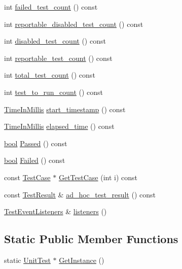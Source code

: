 \begin{DoxyCompactItemize}
int \hyperlink{classtesting_1_1UnitTest_ace1c860482b4ae5c341df5a9665e5c08}{failed\+\_\+test\+\_\+count} () const
\item 
int \hyperlink{classtesting_1_1UnitTest_a2a2835db178d5c8569507db9f0a3d54f}{reportable\+\_\+disabled\+\_\+test\+\_\+count} () const
\item 
int \hyperlink{classtesting_1_1UnitTest_ad69ccf3d4a9bc7333badeafbde3bc76b}{disabled\+\_\+test\+\_\+count} () const
\item 
int \hyperlink{classtesting_1_1UnitTest_a449d0e0350ef146040cd37679c005248}{reportable\+\_\+test\+\_\+count} () const
\item 
int \hyperlink{classtesting_1_1UnitTest_af6e02fcf76fd7247687f4e8af6e7ef41}{total\+\_\+test\+\_\+count} () const
\item 
int \hyperlink{classtesting_1_1UnitTest_a461f46b2976f135d2a65e8d3def746e9}{test\+\_\+to\+\_\+run\+\_\+count} () const
\item 
\hyperlink{namespacetesting_a992de1d091ce660f451d1e8b3ce30fd6}{Time\+In\+Millis} \hyperlink{classtesting_1_1UnitTest_a3d83fe1cc5570a1c34f9754b0f56d65f}{start\+\_\+timestamp} () const
\item 
\hyperlink{namespacetesting_a992de1d091ce660f451d1e8b3ce30fd6}{Time\+In\+Millis} \hyperlink{classtesting_1_1UnitTest_acf608411a17cb3b40a1e9d724f262b3b}{elapsed\+\_\+time} () const
\item 
\hyperlink{classbool}{bool} \hyperlink{classtesting_1_1UnitTest_a7c9b327bc14cb8a282c789dc6513a55b}{Passed} () const
\item 
\hyperlink{classbool}{bool} \hyperlink{classtesting_1_1UnitTest_a706f29e765916616b11a271a65948727}{Failed} () const
\item 
const \hyperlink{classtesting_1_1TestCase}{Test\+Case} $\ast$ \hyperlink{classtesting_1_1UnitTest_a724d4c8be4481e0c1523a22b72dc7dac}{Get\+Test\+Case} (int i) const
\item 
const \hyperlink{classtesting_1_1TestResult}{Test\+Result} \& \hyperlink{classtesting_1_1UnitTest_aa59dde4c3dc43a920ed142a27670686c}{ad\+\_\+hoc\+\_\+test\+\_\+result} () const
\item 
\hyperlink{classtesting_1_1TestEventListeners}{Test\+Event\+Listeners} \& \hyperlink{classtesting_1_1UnitTest_aac10085cf7c0d1751306db10cdd953cb}{listeners} ()
\end{DoxyCompactItemize}
\subsection*{Static Public Member Functions}
\begin{DoxyCompactItemize}
\item 
static \hyperlink{classtesting_1_1UnitTest}{Unit\+Test} $\ast$ \hyperlink{classtesting_1_1UnitTest_a24192400b70b3b946746954e9574fb8e}{Get\+Instance} ()
\end{DoxyCompactItemize}
